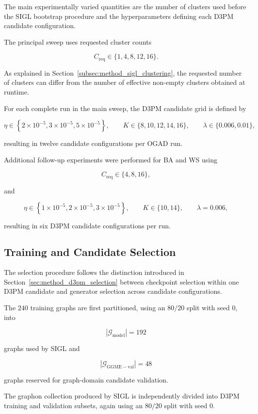 The main experimentally varied quantities are the number of clusters used before the SIGL bootstrap procedure and the hyperparameters defining each D3PM candidate configuration.

The principal sweep uses requested cluster counts

\[
C_{\mathrm{req}}\in\{1,4,8,12,16\}.
\]

As explained in Section~\ref{subsec:method_sigl_clustering}, the requested number of clusters can differ from the number of effective non-empty clusters obtained at runtime.

For each complete run in the main sweep, the D3PM candidate grid is defined by

\[
\eta
\in
\left\{
2\times10^{-5},
3\times10^{-5},
5\times10^{-5}
\right\},
\qquad
K\in\{8,10,12,14,16\},
\qquad
\lambda\in\{0.006,0.01\},
\]

resulting in twelve candidate configurations per OGAD run.

Additional follow-up experiments were performed for BA and WS using

\[
C_{\mathrm{req}}\in\{4,8,16\},
\]

and

\[
\eta
\in
\left\{
1\times10^{-5},
2\times10^{-5},
3\times10^{-5}
\right\},
\qquad
K\in\{10,14\},
\qquad
\lambda=0.006,
\]

resulting in six D3PM candidate configurations per run.


\subsection{Training and Candidate Selection}
\label{subsec:exp_candidate_selection}

The selection procedure follows the distinction introduced in Section~\ref{sec:method_d3pm_selection} between checkpoint selection within one D3PM candidate and generator selection across candidate configurations.

The \(240\) training graphs are first partitioned, using an \(80/20\) split with seed \(0\), into

\[
|\mathcal{G}_{\mathrm{model}}|=192
\]

graphs used by SIGL and

\[
|\mathcal{G}_{\mathrm{GGME-val}}|=48
\]

graphs reserved for graph-domain candidate validation.

The graphon collection produced by SIGL is independently divided into D3PM training and validation subsets, again using an \(80/20\) split with seed \(0\).

